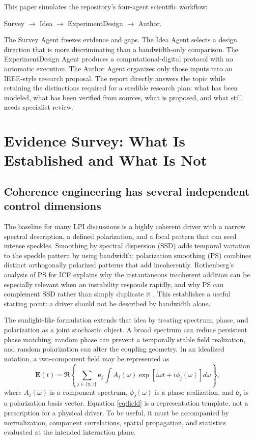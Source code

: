 \documentclass[conference]{../../../../Conference-LaTeX-template_10-17-19/IEEEtran}
\begin{document}
This paper simulates the repository's four-agent scientific workflow:
\begin{center}
Survey $\rightarrow$ Idea $\rightarrow$ ExperimentDesign $\rightarrow$ Author.
\end{center}

The Survey Agent freezes evidence and gaps. The Idea Agent selects a design direction that is more discriminating than a bandwidth-only comparison. The ExperimentDesign Agent produces a computational-digital protocol with no automatic execution. The Author Agent organizes only those inputs into an IEEE-style research proposal. The report directly answers the topic while retaining the distinctions required for a credible research plan: what has been modeled, what has been verified from sources, what is proposed, and what still needs specialist review.

\section{Evidence Survey: What Is Established and What Is Not}
\subsection{Coherence engineering has several independent control dimensions}
The baseline for many LPI discussions is a highly coherent driver with a narrow spectral description, a defined polarization, and a focal pattern that can seed intense speckles. Smoothing by spectral dispersion (SSD) adds temporal variation to the speckle pattern by using bandwidth; polarization smoothing (PS) combines distinct orthogonally polarized patterns that add incoherently. Rothenberg's analysis of PS for ICF explains why the instantaneous incoherent addition can be especially relevant when an instability responds rapidly, and why PS can complement SSD rather than simply duplicate it \cite{rothenberg2000}. This establishes a useful starting point: a driver should not be described by bandwidth alone.

The sunlight-like formulation extends that idea by treating spectrum, phase, and polarization as a joint stochastic object. A broad spectrum can reduce persistent phase matching, random phase can prevent a temporally stable field realization, and random polarization can alter the coupling geometry. In an idealized notation, a two-component field may be represented as
\begin{equation}
\mathbf{E}(t)=\Re\left\{\sum_{j\in\{y,z\}}\mathbf{e}_j\int A_j(\omega)\exp\left[i\omega t+i\phi_j(\omega)\right]d\omega\right\},
\label{eq:field}
\end{equation}
where $A_j(\omega)$ is a component spectrum, $\phi_j(\omega)$ is a phase realization, and $\mathbf{e}_j$ is a polarization basis vector. Equation \eqref{eq:field} is a representation template, not a prescription for a physical driver. To be useful, it must be accompanied by normalization, component correlations, spatial propagation, and statistics evaluated at the intended interaction plane.
\end{document}
